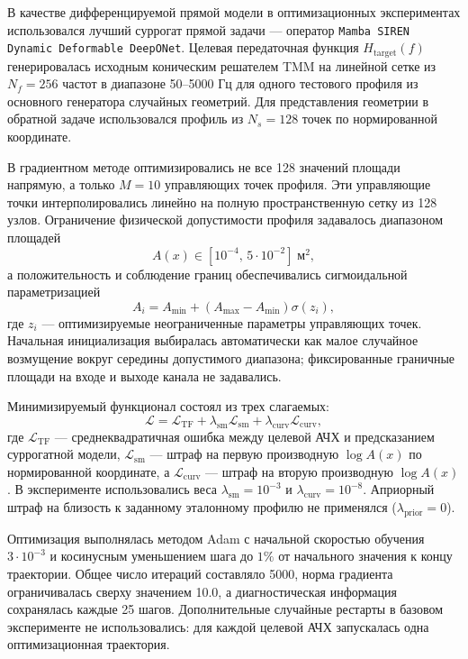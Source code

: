 В качестве дифференцируемой прямой модели в оптимизационных экспериментах использовался лучший суррогат прямой задачи --- оператор \texttt{Mamba SIREN Dynamic Deformable DeepONet}. Целевая передаточная функция $H_{\mathrm{target}}(f)$ генерировалась исходным коническим решателем TMM на линейной сетке из $N_f = 256$ частот в диапазоне 50--5000 Гц для одного тестового профиля из основного генератора случайных геометрий. Для представления геометрии в обратной задаче использовался профиль из $N_s = 128$ точек по нормированной координате.

В градиентном методе оптимизировались не все 128 значений площади напрямую, а только $M = 10$ управляющих точек профиля. Эти управляющие точки интерполировались линейно на полную пространственную сетку из 128 узлов. Ограничение физической допустимости профиля задавалось диапазоном площадей
\begin{equation}
    A(x) \in [10^{-4},\, 5 \cdot 10^{-2}] \;\text{м}^2,
\end{equation}
а положительность и соблюдение границ обеспечивались сигмоидальной параметризацией
\begin{equation}
    A_i = A_{\min} + (A_{\max} - A_{\min}) \sigma(z_i),
\end{equation}
где $z_i$ --- оптимизируемые неограниченные параметры управляющих точек. Начальная инициализация выбиралась автоматически как малое случайное возмущение вокруг середины допустимого диапазона; фиксированные граничные площади на входе и выходе канала не задавались.

Минимизируемый функционал состоял из трех слагаемых:
\begin{equation}
    \mathcal{L} =
    \mathcal{L}_{\mathrm{TF}}
    + \lambda_{\mathrm{sm}} \mathcal{L}_{\mathrm{sm}}
    + \lambda_{\mathrm{curv}} \mathcal{L}_{\mathrm{curv}},
\end{equation}
где $\mathcal{L}_{\mathrm{TF}}$ --- среднеквадратичная ошибка между целевой АЧХ и предсказанием суррогатной модели, $\mathcal{L}_{\mathrm{sm}}$ --- штраф на первую производную $\log A(x)$ по нормированной координате, а $\mathcal{L}_{\mathrm{curv}}$ --- штраф на вторую производную $\log A(x)$. В эксперименте использовались веса $\lambda_{\mathrm{sm}} = 10^{-3}$ и $\lambda_{\mathrm{curv}} = 10^{-8}$. Априорный штраф на близость к заданному эталонному профилю не применялся ($\lambda_{\mathrm{prior}} = 0$).

Оптимизация выполнялась методом Adam с начальной скоростью обучения $3 \cdot 10^{-3}$ и косинусным уменьшением шага до $1\%$ от начального значения к концу траектории. Общее число итераций составляло 5000, норма градиента ограничивалась сверху значением 10.0, а диагностическая информация сохранялась каждые 25 шагов. Дополнительные случайные рестарты в базовом эксперименте не использовались: для каждой целевой АЧХ запускалась одна оптимизационная траектория.

